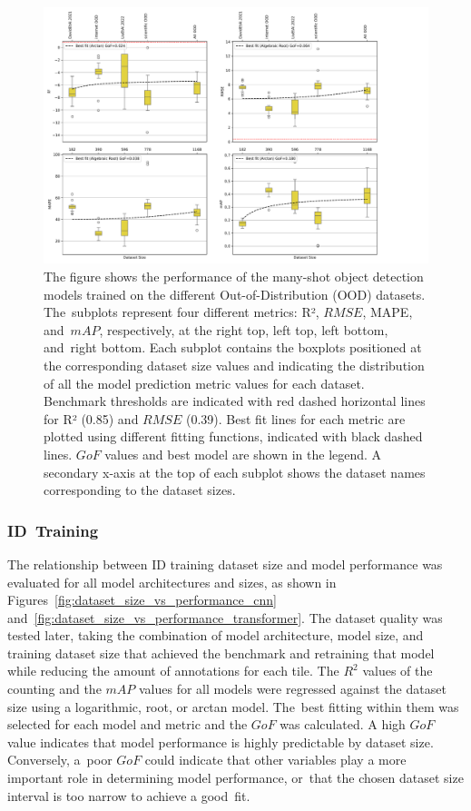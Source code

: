 \documentclass[12pt,a4paper,oneside]{report}
\begin{document}
\begin{landscape}
\begin{figure}
\includegraphics[width=\linewidth]{Plots/metrics_OOD_datasets.pdf}
\caption{The figure shows the performance of the many-shot object detection models 
trained on 
the different Out-of-Distribution (OOD) datasets. The~subplots represent four different metrics: 
R², $RMSE$, MAPE, and~$mAP$, respectively, at the right top, left top, left bottom, and~right bottom.
Each subplot contains the boxplots
positioned at the corresponding dataset size values and indicating the distribution of
all the model prediction metric values for each dataset.
Benchmark thresholds are indicated with red 
dashed horizontal lines for R² (0.85) and $RMSE$ (0.39). Best fit lines for each metric are 
plotted using different fitting functions, 
indicated with black dashed lines. $GoF$ values and best model are shown in the
legend.
A secondary x-axis at the top of each subplot 
shows the dataset names corresponding to the dataset sizes.}
\label{fig:metrics_OOD_datasets}
\end{figure}
\end{landscape}

\subsubsection{ID~Training}

The relationship between ID training dataset size and model performance was evaluated 
for all model architectures and sizes, as shown in Figures~\ref{fig:dataset_size_vs_performance_cnn} and~\ref{fig:dataset_size_vs_performance_transformer}. 
The dataset quality was tested later, taking the combination of model architecture, model size, and
training dataset size that achieved the benchmark and retraining that model while reducing the amount of
annotations for each tile. 
The $R^2$ values of the counting and the $mAP$ values for all models were regressed 
against the dataset size using a logarithmic, root, or arctan model. The~best fitting
within them was selected for each model and metric and the $GoF$ was calculated.
A high $GoF$ value indicates that model performance is highly predictable by dataset size. 
Conversely, a~poor $GoF$ could indicate that other variables play a more important 
role in determining model performance, or~that the chosen dataset size interval is 
too narrow to achieve a good~fit.
\end{document}
